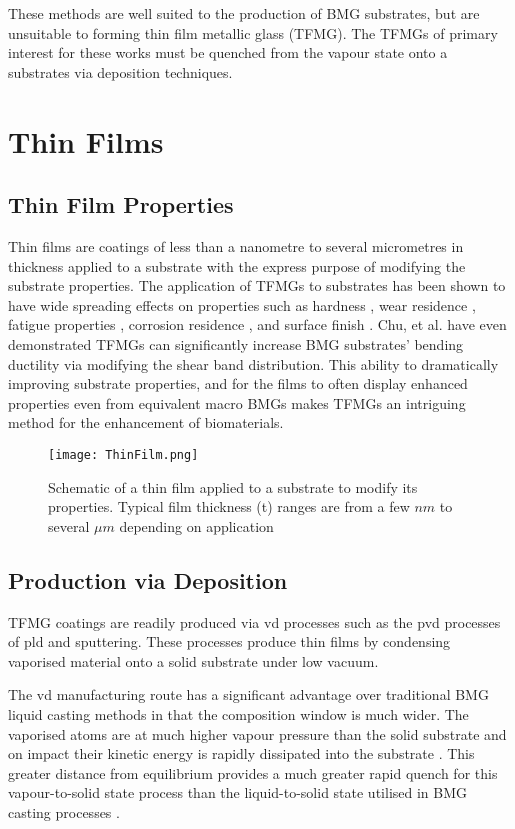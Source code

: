 \documentclass[draft,a4paper,12pt,oneside]{report}%
\begin{document}
These methods are well suited to the production of BMG substrates, but are unsuitable to forming thin film metallic glass (TFMG). The TFMGs of primary interest for these works must be quenched from the vapour state onto a substrates via deposition techniques.

\section{Thin Films}
\subsection{Thin Film Properties}
Thin films are coatings of less than a nanometre to several micrometres in thickness applied to a substrate with the express purpose of modifying the substrate properties. The application of TFMGs to substrates has been shown to have wide spreading effects on properties such as hardness  \cite{Chu2012}, wear residence \cite{Liu2009, Prakash2005}, fatigue properties \cite{Chiang2006, Chu2011}, corrosion residence \cite{Chu2009}, and surface finish \cite{Liu2009, Chiang2006, Chu2011, Tsai2012}. Chu, et al. \cite{Chu2012} have even demonstrated TFMGs can significantly increase BMG substrates' bending ductility via modifying the shear band distribution. This ability to dramatically improving substrate properties, and for the films to often display enhanced properties even from equivalent macro BMGs makes TFMGs an intriguing method for the enhancement of biomaterials. 

\begin{figure}[htbp]
	\centering
	\texttt{[image: ThinFilm.png]}
	\caption[Thin Film Schematic]{Schematic of a thin film applied to a substrate to modify its properties. Typical film thickness (t) ranges are from a few $nm$ to several $\mu m$ depending on application}
	\label{fig:ThinFilm}
\end{figure}

\subsection{Production via Deposition}
TFMG coatings are readily produced via \gls{vd} processes such as the \gls{pvd} processes of \gls{pld} and sputtering. These processes produce thin films by condensing vaporised material onto a solid substrate under low vacuum. 

The \gls{vd} manufacturing route has a significant advantage over traditional BMG liquid casting methods in that the composition window is much wider. The vaporised atoms are at much higher vapour pressure than the solid substrate and on impact their kinetic energy is rapidly dissipated into the substrate \cite{Ishii2014}. This greater distance from equilibrium provides a much greater rapid quench for this vapour-to-solid state process than the liquid-to-solid state utilised in BMG casting processes \cite{Chu2012b}. 
\end{document}
